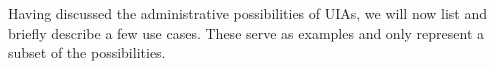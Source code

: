 Having discussed the administrative possibilities of UIAs, we will now list and
briefly describe a few use cases. These serve as examples and only represent a
subset of the possibilities.
